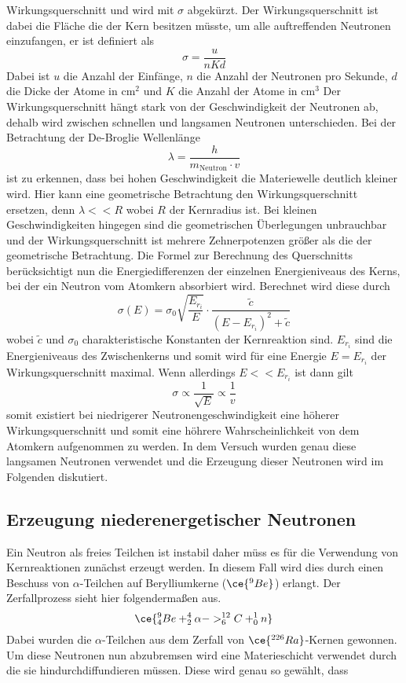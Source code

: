 Wirkungsquerschnitt und wird mit $\sigma$ abgekürzt.
Der Wirkungsquerschnitt ist dabei die Fläche die der Kern besitzen müsste, um alle auftreffenden Neutronen einzufangen, er ist definiert als
\begin{equation}
\sigma = \frac{u}{nKd}
\end{equation}
Dabei ist $u$ die Anzahl der Einfänge, $n$ die Anzahl der Neutronen pro Sekunde, $d$ die Dicke der Atome in $\si{\centi\meter\squared}$ und $K$ die Anzahl der Atome in $\si{\centi\meter\cubed}$
Der Wirkungsquerschnitt hängt stark von der Geschwindigkeit der Neutronen ab, dehalb wird zwischen schnellen und langsamen Neutronen unterschieden.
Bei der Betrachtung der De-Broglie Wellenlänge
\begin{equation}
\lambda = \frac{h}{m_{\text{Neutron}} \cdot v} 
\end{equation}
ist zu erkennen, dass bei hohen Geschwindigkeit die Materiewelle deutlich kleiner wird. Hier kann eine geometrische Betrachtung den Wirkungsquerschnitt ersetzen, denn $\lambda << R$ wobei $R$ der Kernradius ist.
Bei kleinen Geschwindigkeiten hingegen sind die geometrischen Überlegungen unbrauchbar und der Wirkungsquerschnitt ist mehrere Zehnerpotenzen größer als die der geometrische Betrachtung.
Die Formel zur Berechnung des Querschnitts berücksichtigt nun die Energiedifferenzen der einzelnen Energieniveaus des Kerns, bei der ein Neutron vom Atomkern absorbiert wird.
Berechnet wird diese durch
\begin{equation}
\sigma(E) = \sigma_{0} \sqrt{\frac{E_{r_{i}}}{E}} \cdot \frac{\tilde{c}}{(E - E_{r_{i}})^{2} + \tilde{c}}
\end{equation}
wobei $\tilde c$ und $\sigma_{0}$ charakteristische Konstanten der Kernreaktion sind. $E_{{r}_{i}}$ sind die Energieniveaus des Zwischenkerns und somit wird für eine Energie $E = E_{{r}_{i}}$
der Wirkungsquerschnitt maximal. Wenn allerdings $E << E_{{r}_{i}}$ ist dann gilt
\begin{equation}
\sigma \propto \frac{1}{\sqrt{E}} \propto \frac{1}{v}
\end{equation}
somit existiert bei niedrigerer Neutronengeschwindigkeit eine höherer Wirkungsquerschnitt und somit eine höhrere Wahrscheinlichkeit von dem Atomkern aufgenommen zu werden.
In dem Versuch wurden genau diese langsamen Neutronen verwendet und die Erzeugung dieser Neutronen wird im Folgenden diskutiert.

\subsection{Erzeugung niederenergetischer Neutronen}
Ein Neutron als freies Teilchen ist instabil daher müss es für die Verwendung von Kernreaktionen zunächst erzeugt werden.
In diesem Fall wird dies durch einen Beschuss von $\alpha$-Teilchen auf Berylliumkerne ($\ce{^{9}Be}$) erlangt.
Der Zerfallprozess sieht hier folgendermaßen aus.
\begin{equation}
\ce{^{9}_{4}Be + ^{4}_{2}{\alpha} -> ^{12}_{6}C + ^{1}_{0}n}
\end{equation}
Dabei wurden die $\alpha$-Teilchen aus dem Zerfall von $\ce{^{226}Ra}$-Kernen gewonnen. Um diese Neutronen nun abzubremsen wird eine Materieschicht verwendet durch die sie hindurchdiffundieren müssen.
Diese wird genau so gewählt, dass